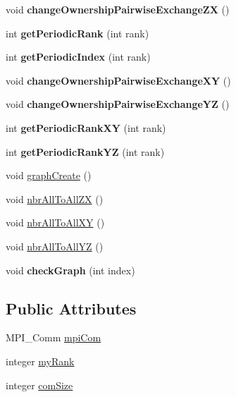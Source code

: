 \begin{DoxyCompactItemize}
\mbox{\label{structMpiCom_affba5dc6e99efb80e820f98a4ed28565}} 
void {\bfseries change\+Ownership\+Pairwise\+Exchange\+ZX} ()
\item 
\mbox{\label{structMpiCom_af1cef3da300b89e37a0ecf353ea70c50}} 
int {\bfseries get\+Periodic\+Rank} (int rank)
\item 
\mbox{\label{structMpiCom_aa5b66001754035269b1ff41ef33d8e31}} 
int {\bfseries get\+Periodic\+Index} (int rank)
\item 
\mbox{\label{structMpiCom_ab538d16d98a8b4b72753688112092ecf}} 
void {\bfseries change\+Ownership\+Pairwise\+Exchange\+XY} ()
\item 
\mbox{\label{structMpiCom_a903120d2408f86afe2edf4ec5947bf50}} 
void {\bfseries change\+Ownership\+Pairwise\+Exchange\+YZ} ()
\item 
\mbox{\label{structMpiCom_a58c523846ef78d30d553a6fccad2aa08}} 
int {\bfseries get\+Periodic\+Rank\+XY} (int rank)
\item 
\mbox{\label{structMpiCom_aaa1993d090f1b3db7b46357e4da935e6}} 
int {\bfseries get\+Periodic\+Rank\+YZ} (int rank)
\item 
void \mbox{\hyperlink{structMpiCom_a0e7f0633348f928e92f5bfe22f48a40d}{graph\+Create}} ()
\item 
void \mbox{\hyperlink{structMpiCom_a8e3a47d8f20b9ac6960cddf641050d44}{nbr\+All\+To\+All\+ZX}} ()
\item 
void \mbox{\hyperlink{structMpiCom_a19fa8f600a430ba4e5e3ea6f53deb649}{nbr\+All\+To\+All\+XY}} ()
\item 
void \mbox{\hyperlink{structMpiCom_a003eaf50d2715dd49bfa1ef3e1d8c09a}{nbr\+All\+To\+All\+YZ}} ()
\item 
\mbox{\label{structMpiCom_a24444ee55e0a7a2776f53b23b280b058}} 
void {\bfseries check\+Graph} (int index)
\end{DoxyCompactItemize}
\subsection*{Public Attributes}
\begin{DoxyCompactItemize}
\item 
M\+P\+I\+\_\+\+Comm \mbox{\hyperlink{structMpiCom_a9ebe073c2a5d866e2eeeffeddc5d6ed9}{mpi\+Com}}
\item 
integer \mbox{\hyperlink{structMpiCom_a822a5db15cf1bf27f846cec23de7c785}{my\+Rank}}
\item 
integer \mbox{\hyperlink{structMpiCom_a4eed91926f470dfd8f21e1ad8c6fdcec}{com\+Size}}
\end{DoxyCompactItemize}

